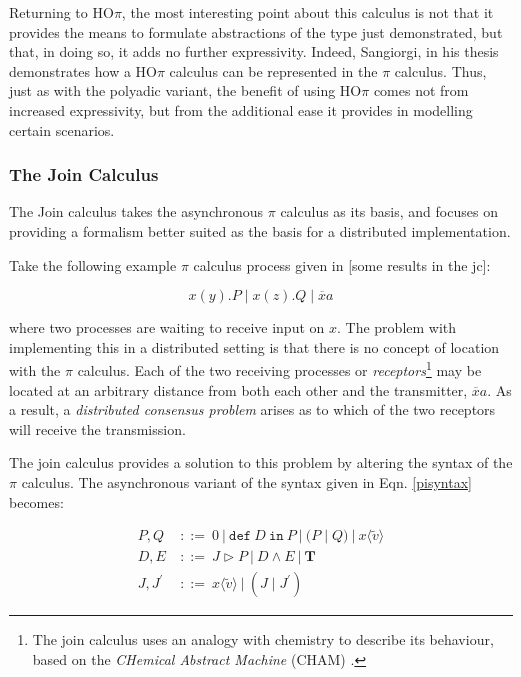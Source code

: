 Returning to HO$\pi$, the most interesting point about this calculus
is not that it provides the means to formulate abstractions of the
type just demonstrated, but that, in doing so, it adds no further
expressivity.  Indeed, Sangiorgi, in his thesis \cite{sangiorgi:phd}
demonstrates how a HO$\pi$ calculus can be represented in the $\pi$
calculus.  Thus, just as with the polyadic variant, the benefit of
using HO$\pi$ comes not from increased expressivity, but from the
additional ease it provides in modelling certain scenarios.

\subsubsection{The Join Calculus}

The Join calculus \cite{join} takes the asynchronous $\pi$ calculus as
its basis, and focuses on providing a formalism better suited as the
basis for a distributed implementation.

Take the following example $\pi$ calculus process given in [some results in the jc]:

\begin{equation}
x(y).P\;|\;x(z).Q\;|\;\overline{x}a
\end{equation}

\noindent where two processes are waiting to receive input on $x$.
The problem with implementing this in a distributed setting is that
there is no concept of location with the $\pi$ calculus.  Each of the
two receiving processes or \emph{receptors}\footnote{The join calculus
  uses an analogy with chemistry to describe its behaviour, based on
  the \emph{CHemical Abstract Machine} (CHAM) \cite{cham}.} may be
located at an arbitrary distance from both each other and the
transmitter, $\overline{x}a$.  As a result, a \emph{distributed
  consensus problem} arises as to which of the two receptors will
receive the transmission.

The join calculus provides a solution to this problem by altering the
syntax of the $\pi$ calculus.  The asynchronous variant of the
syntax given in Eqn. \ref{pisyntax} becomes:

\begin{align}
\label{joinsyntax}
  P, Q\ & ::=\ 
  0\ |\ 
  \mathtt{def}\ D\ \mathtt{in}\ P\ |\
  (P\;|\;Q)\ |\ 
  x\langle \tilde{v} \rangle \\
  D, E\ & ::=\
  J \rhd P\ |\
  D \wedge E\ |\ 
  \mathbf{T} \\
  J,J^\prime\ & ::=\ 
  x\langle \tilde{v} \rangle\ |\
  (J\;|\;J^\prime)
\end{align}

